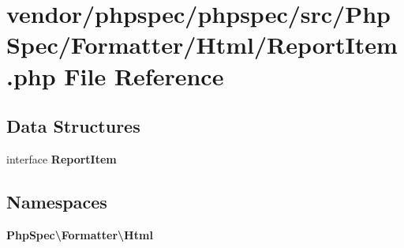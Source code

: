 \section{vendor/phpspec/phpspec/src/\+Php\+Spec/\+Formatter/\+Html/\+Report\+Item.php File Reference}
\label{_report_item_8php}
\subsection*{Data Structures}
\begin{DoxyCompactItemize}
\item 
interface {\bf Report\+Item}
\end{DoxyCompactItemize}
\subsection*{Namespaces}
\begin{DoxyCompactItemize}
\item 
 {\bf Php\+Spec\textbackslash{}\+Formatter\textbackslash{}\+Html}
\end{DoxyCompactItemize}
